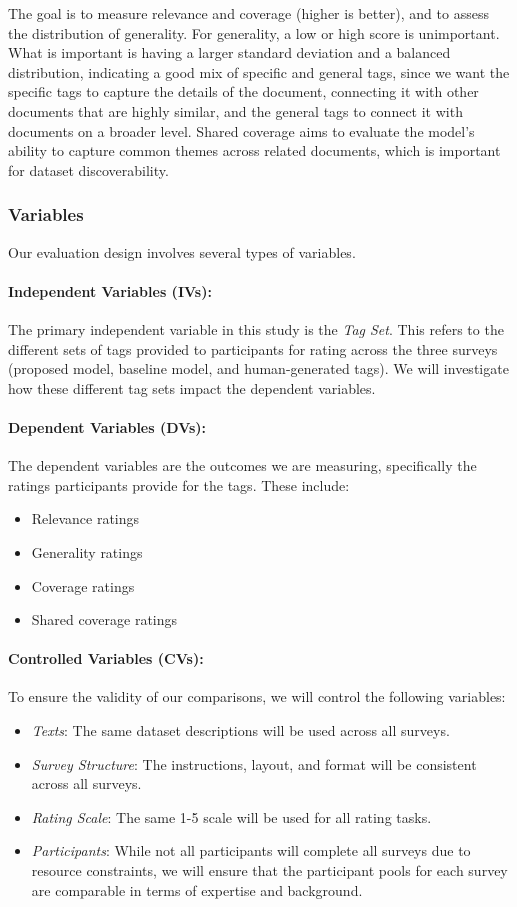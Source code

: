 The goal is to measure relevance and coverage (higher is better), and to assess the distribution of generality. For generality, a low or high score is unimportant. What is important is having a larger standard deviation and a balanced distribution, indicating a good mix of specific and general tags, since we want the specific tags to capture the details of the document, connecting it with other documents that are highly similar, and the general tags to connect it with documents on a broader level. Shared coverage aims to evaluate the model's ability to capture common themes across related documents, which is important for dataset discoverability.


\subsubsection{Variables}
Our evaluation design involves several types of variables.

\paragraph{Independent Variables (IVs):}
The primary independent variable in this study is the \textit{Tag Set}. This refers to the different sets of tags provided to participants for rating across the three surveys (proposed model, baseline model, and human-generated tags). We will investigate how these different tag sets impact the dependent variables.

\paragraph{Dependent Variables (DVs):}
The dependent variables are the outcomes we are measuring, specifically the ratings participants provide for the tags. These include:
\begin{itemize}
\item Relevance ratings
\item Generality ratings
\item Coverage ratings
\item Shared coverage ratings
\end{itemize}

\paragraph{Controlled Variables (CVs):}
To ensure the validity of our comparisons, we will control the following variables:
\begin{itemize}
\item \textit{Texts}: The same dataset descriptions will be used across all surveys.
\item \textit{Survey Structure}: The instructions, layout, and format will be consistent across all surveys.
\item \textit{Rating Scale}: The same 1-5 scale will be used for all rating tasks.
\item \textit{Participants}: While not all participants will complete all surveys due to resource constraints, we will ensure that the participant pools for each survey are comparable in terms of expertise and background.
\end{itemize}

